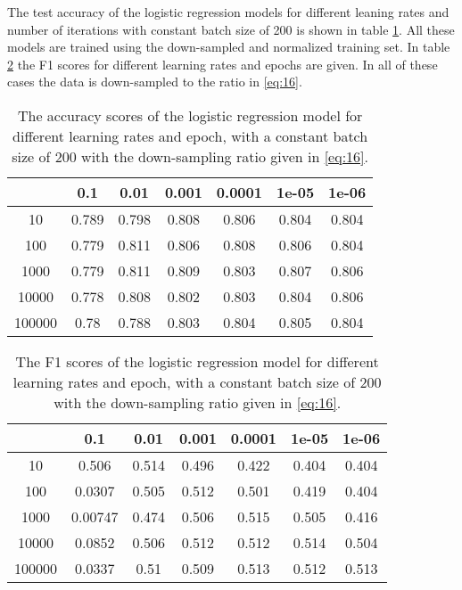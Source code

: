 \documentclass[uio,jmp,amsmath,amssymb,reprint,nofootinbib]{revtex4-1}
\numberwithin{equation}{section}
\begin{document}
The test accuracy of the logistic regression models for different leaning rates and number of iterations with constant batch size of 200 is shown in table \ref{tab:01}. All these models are trained using the down-sampled and normalized training set. In table \ref{tab:02} the F1 scores for different learning rates and epochs are given. In all of these cases the data is down-sampled to the ratio in \ref{eq:16}.


\begin{table}[H]
\caption{The accuracy scores of the logistic regression model for different learning rates and epoch, with a constant batch size of 200 with the down-sampling ratio given in \ref{eq:16}.}
\begin{tabular}{|c|c|c|c|c|c|c|}\hline
  & 0.1 & 0.01 & 0.001 & 0.0001 & 1e-05 & 1e-06 \\ \hline
10 & 0.789 & 0.798 & 0.808 & 0.806 & 0.804 & 0.804 \\ \hline
100 & 0.779 & 0.811 & 0.806 & 0.808 & 0.806 & 0.804 \\ \hline
1000 & 0.779 & 0.811 & 0.809 & 0.803 & 0.807 & 0.806 \\ \hline
10000 & 0.778 & 0.808 & 0.802 & 0.803 & 0.804 & 0.806 \\ \hline
100000 & 0.78 & 0.788 & 0.803 & 0.804 & 0.805 & 0.804 \\ \hline
\end{tabular}
\label{tab:01}
\end{table}

\begin{table}[H]
\caption{The F1 scores of the logistic regression model for different learning rates and epoch, with a constant batch size of 200 with the down-sampling ratio given in \ref{eq:16}.}
\begin{tabular}{|c|c|c|c|c|c|c|}\hline
  & 0.1 & 0.01 & 0.001 & 0.0001 & 1e-05 & 1e-06 \\ \hline
10 & 0.506 & 0.514 & 0.496 & 0.422 & 0.404 & 0.404 \\ \hline
100 & 0.0307 & 0.505 & 0.512 & 0.501 & 0.419 & 0.404 \\ \hline
1000 & 0.00747 & 0.474 & 0.506 & 0.515 & 0.505 & 0.416 \\ \hline
10000 & 0.0852 & 0.506 & 0.512 & 0.512 & 0.514 & 0.504 \\ \hline
100000 & 0.0337 & 0.51 & 0.509 & 0.513 & 0.512 & 0.513 \\ \hline
\end{tabular}
\label{tab:02}
\end{table}
\end{document}
